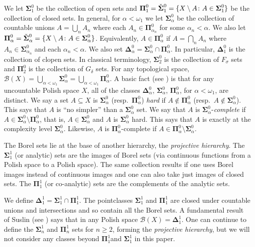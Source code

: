 \documentclass{amsart}
\theoremstyle{definition}
\newcommand{\sB}{\mathcal{B}}
\newcommand{\bs}{\boldsymbol{\Sigma}}
\newcommand{\bp}{\boldsymbol{\Pi}}
\newcommand{\bsdzo}{{\check{\boldsymbol{\Sigma}}}^{\raisebox{-2pt}{\scriptsize{0}}}_1}
\newcommand{\bsdza}{{\check{\boldsymbol{\Sigma}}}^{\raisebox{-2pt}{\scriptsize{0}}}_\alpha}
\newcommand{\bd}{\boldsymbol{\Delta}}
\begin{document}
We let $\bs^0_1$ be the collection of open sets and  $\bp^0_1=
\bsdzo= \{ X\setminus A\colon A \in \bs^0_1\}$ be the collection of closed sets.
In general, for $\alpha<\omega_1$ we let $\bs^0_\alpha$ be the collection of
countable unions $A=\bigcup_n A_n$ where each $A_n \in \bp^0_{\alpha_n}$
for some $\alpha_n<\alpha$. We also let $\bp^0_\alpha= \bsdza= \{ X\setminus A\colon A \in \bs^0_\alpha\}$.
Equivalently, $A\in \bp^0_\alpha$ if $A=\bigcap_n A_n$ where
$A_n\in \bs^0_{\alpha_n}$ and each $\alpha_n<\alpha$.
We also set $\bd^0_\alpha= \bs^0_\alpha \cap \bp^0_\alpha$. In particular,
$\bd^0_1$ is the collection of clopen sets.
In classical terminology, $\bs^0_2$ is the collection of $F_\sigma$ sets and $\bp^0_2$
is the collection of $G_\delta$ sets.
For any topological space, $\sB(X)=\bigcup_{\alpha<\omega_1} \bs^0_\alpha=
\bigcup_{\alpha<\omega_1}\bp^0_\alpha$. A basic fact (see \cite{Kechris})
is that for any uncountable Polish space $X$, all of the classes $\bd^0_\alpha$, $\bs^0_\alpha$, $\bp^0_\alpha$, for $\alpha <\omega_1$,
are  distinct.  We say a set
$A\subseteq X$ is $\bs^0_\alpha$ (resp.\ $\bp^0_\alpha$) {\em hard}
if $A \notin \bp^0_\alpha$ (resp.\ $A\notin \bs^0_\alpha$). This says that $A$ is
``no simpler'' than a $\bs^0_\alpha$ set. We say that $A$ is $\bs^0_\alpha$-{\em complete}
if $A\in \bs^0_\alpha\setminus \bp^0_\alpha$, that is, $A \in \bs^0_\alpha$ and
$A$ is $\bs^0_\alpha$ hard. This says that $A$ is exactly at the complexity level
$\bs^0_\alpha$. Likewise, $A$ is $\bp^0_\alpha$-complete if $A\in \bp^0_\alpha\setminus \bs^0_\alpha$.



The Borel sets lie at the base of another hierarchy, the
{\em projective hierarchy}. The $\bs^1_1$ (or analytic) sets are the images
 of Borel sets (via continuous functions from a Polish space to a Polish space). The
same collection results if one uses Borel images instead of continuous images  and
one can also take just images of closed sets. The $\bp^1_1$ (or co-analytic) sets
are the complements of the analytic sets.

We define $\bd^1_1=\bs^1_1\cap \bp^1_1$.
The pointclasses $\bs^1_1$ and $\bp^1_1$ are closed under countable unions and intersections
and so contain all the Borel sets.
A fundamental result of Suslin (see \cite{Kechris}) says that in any
Polish space $\sB(X)=\bd^1_1$. One can continue to define the
$\bs^1_n$ and $\bp^1_n$ sets for $n \geq 2$, forming the {\em projective hierarchy},
but we will not consider any
classes beyond $\bp^1_1$and $\bs^1_1$ in this paper.
\end{document}
